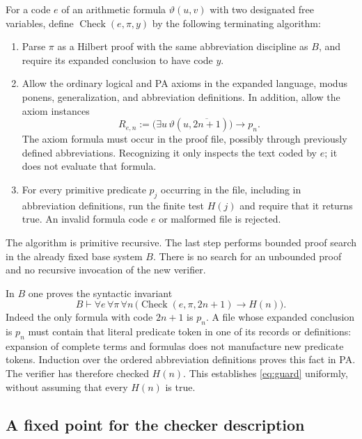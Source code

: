 \documentclass[11pt]{article}
\theoremstyle{remark}
\newcommand{\Chk}{\operatorname{Check}}
\newcommand{\num}[1]{\overline{#1}}
\begin{document}
For a code $e$ of an arithmetic formula $\vartheta(u,v)$ with two designated
free variables, define $\Chk(e,\pi,y)$ by the following terminating
algorithm:
\begin{enumerate}
\item Parse $\pi$ as a Hilbert proof with the same abbreviation discipline as
$B$, and require its expanded conclusion to have code $y$.
\item Allow the ordinary logical and PA axioms in the expanded language,
modus ponens, generalization, and abbreviation definitions. In addition,
allow the axiom instances
\begin{equation}\label{eq:param-reflection}
 R_{e,n}:=\bigl(\exists u\,\vartheta(u,\num{2n+1})\bigr)\to p_n.
\end{equation}
The axiom formula must occur in the proof file, possibly through previously
defined abbreviations. Recognizing it only inspects the text coded by $e$;
it does not evaluate that formula.
\item For every primitive predicate $p_j$ occurring in the file, including
in abbreviation definitions, run the finite test $H(j)$ and require that it
returns true. An invalid formula code $e$ or malformed file is rejected.
\end{enumerate}

The algorithm is primitive recursive. The last step performs bounded proof
search in the already fixed base system $B$. There is no search for an
unbounded proof and no recursive invocation of the new verifier.

In $B$ one proves the syntactic invariant
\begin{equation}\label{eq:guard}
 B\vdash\forall e\,\forall\pi\,\forall n\,
 \bigl(\Chk(e,\pi,2n+1)\to H(n)\bigr).
\end{equation}
Indeed the only formula with code $2n+1$ is $p_n$. A file whose expanded
conclusion is $p_n$ must contain that literal predicate token in one of its
records or definitions: expansion of complete terms and formulas does not
manufacture new predicate tokens. Induction over the ordered abbreviation
definitions proves this fact in PA. The verifier has therefore checked
$H(n)$. This establishes \eqref{eq:guard} uniformly, without assuming that
every $H(n)$ is true.

\subsection{A fixed point for the checker description}
\end{document}
